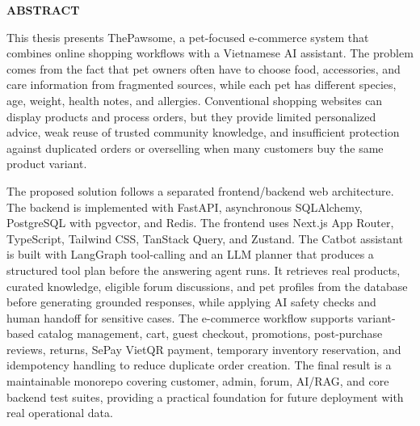 \documentclass[../DoAn.tex]{subfiles}
\begin{document}
\begin{center}
    \Large{\textbf{ABSTRACT}}\\
\end{center}
\vspace{1cm}
This thesis presents ThePawsome, a pet-focused e-commerce system that combines online shopping workflows with a Vietnamese AI assistant. The problem comes from the fact that pet owners often have to choose food, accessories, and care information from fragmented sources, while each pet has different species, age, weight, health notes, and allergies. Conventional shopping websites can display products and process orders, but they provide limited personalized advice, weak reuse of trusted community knowledge, and insufficient protection against duplicated orders or overselling when many customers buy the same product variant.

The proposed solution follows a separated frontend/backend web architecture. The backend is implemented with FastAPI, asynchronous SQLAlchemy, PostgreSQL with pgvector, and Redis. The frontend uses Next.js App Router, TypeScript, Tailwind CSS, TanStack Query, and Zustand. The Catbot assistant is built with LangGraph tool-calling and an LLM planner that produces a structured tool plan before the answering agent runs. It retrieves real products, curated knowledge, eligible forum discussions, and pet profiles from the database before generating grounded responses, while applying AI safety checks and human handoff for sensitive cases. The e-commerce workflow supports variant-based catalog management, cart, guest checkout, promotions, post-purchase reviews, returns, SePay VietQR payment, temporary inventory reservation, and idempotency handling to reduce duplicate order creation. The final result is a maintainable monorepo covering customer, admin, forum, AI/RAG, and core backend test suites, providing a practical foundation for future deployment with real operational data.
\end{document}
